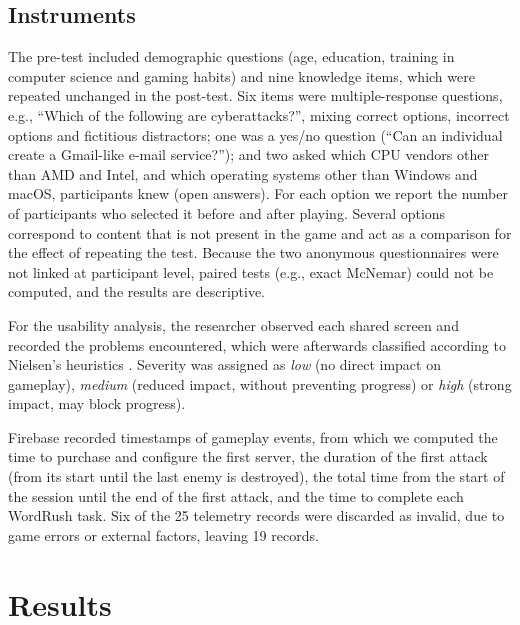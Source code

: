 \documentclass[runningheads]{llncs}
\begin{document}
\subsection{Instruments}

The pre-test included demographic questions (age, education, training in computer science and gaming habits) and nine knowledge items, which were repeated unchanged in the post-test. Six items were multiple-response questions, e.g., ``Which of the following are cyberattacks?'', mixing correct options, incorrect options and fictitious distractors; one was a yes/no question (``Can an individual create a Gmail-like e-mail service?''); and two asked which CPU vendors other than AMD and Intel, and which operating systems other than Windows and macOS, participants knew (open answers). For each option we report the number of participants who selected it before and after playing. Several options correspond to content that is not present in the game and act as a comparison for the effect of repeating the test. Because the two anonymous questionnaires were not linked at participant level, paired tests (e.g., exact McNemar) could not be computed, and the results are descriptive.

For the usability analysis, the researcher observed each shared screen and recorded the problems encountered, which were afterwards classified according to Nielsen's heuristics \cite{nielsen1994enhancing}. Severity was assigned as \emph{low} (no direct impact on gameplay), \emph{medium} (reduced impact, without preventing progress) or \emph{high} (strong impact, may block progress).

Firebase recorded timestamps of gameplay events, from which we computed the time to purchase and configure the first server, the duration of the first attack (from its start until the last enemy is destroyed), the total time from the start of the session until the end of the first attack, and the time to complete each WordRush task. Six of the 25 telemetry records were discarded as invalid, due to game errors or external factors, leaving 19 records.

\section{Results}
\end{document}
